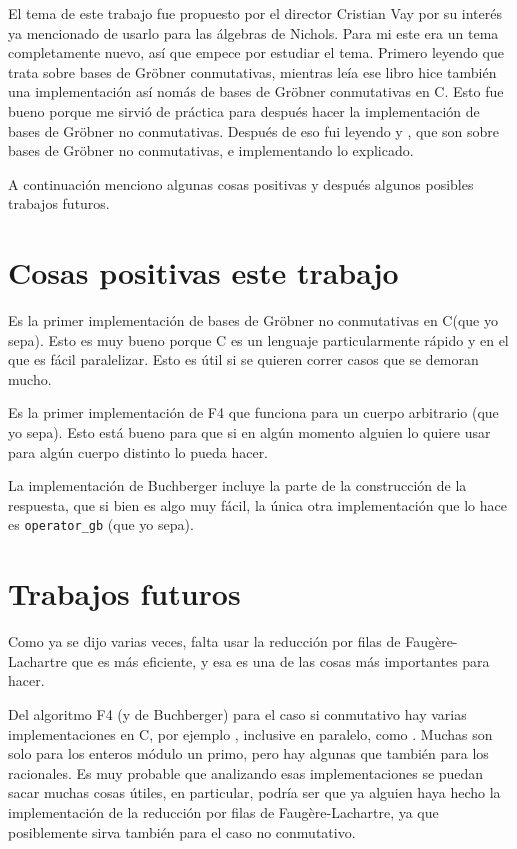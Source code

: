 \documentclass[12pt]{report}
\theoremstyle{customstyle}
\theoremstyle{factstyle}
\newcommand\cpp{C\nolinebreak[4]\hspace{-.05em}\raisebox{.4ex}{\relsize{-3}{\textbf{++}}}\xspace}
\begin{document}
El tema de este trabajo fue propuesto por el director Cristian Vay por su interés ya mencionado de usarlo para las álgebras de Nichols. Para mi este era un tema completamente nuevo, así que empece por estudiar el tema. Primero leyendo \cite{book:ideals-varieties-algorithms} que trata sobre bases de Gröbner conmutativas, mientras leía ese libro hice también una implementación así nomás de bases de Gröbner conmutativas en \cpp. Esto fue bueno porque me sirvió de práctica para después hacer la implementación de bases de Gröbner no conmutativas. Después de eso fui leyendo \cite{thesis:Hof20} y \cite{phdthesis:Hof23}, que son sobre bases de Gröbner no conmutativas, e implementando lo explicado.

A continuación menciono algunas cosas positivas y después algunos posibles trabajos futuros.

\section{Cosas positivas este trabajo}

Es la primer implementación de bases de Gröbner no conmutativas en \cpp (que yo sepa). Esto es muy bueno porque \cpp es un lenguaje particularmente rápido y en el que es fácil paralelizar. Esto es útil si se quieren correr casos que se demoran mucho.

Es la primer implementación de F4 que funciona para un cuerpo arbitrario (que yo sepa). Esto está bueno para que si en algún momento alguien lo quiere usar para algún cuerpo distinto lo pueda hacer.

La implementación de Buchberger incluye la parte de la construcción de la respuesta, que si bien es algo muy fácil, la única otra implementación que lo hace es \texttt{operator\_gb} (que yo sepa).

\section{Trabajos futuros}\label{section:trabajos futuros}

Como ya se dijo varias veces, falta usar la reducción por filas de Faugère-Lachartre que es más eficiente, y esa es una de las cosas más importantes para hacer.

Del algoritmo F4 (y de Buchberger) para el caso si conmutativo hay varias implementaciones en \cpp, por ejemplo \cite{lib:openf4, lib:mathic, lib:M4GB}, inclusive en paralelo, como \cite{DBLP:journals/jsc/Reeves98, lib:parallelGBC}. Muchas son solo para los enteros módulo un primo, pero hay algunas que también para los racionales. Es muy probable que analizando esas implementaciones se puedan sacar muchas cosas útiles, en particular, podría ser que ya alguien haya hecho la implementación de la reducción por filas de Faugère-Lachartre, ya que posiblemente sirva también para el caso no conmutativo.
\end{document}
